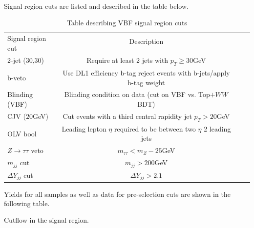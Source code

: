 Signal region cuts are listed and described in the table below.  

\begin{table}[h!]
\centering
\small{
\begin{tabular}{|l|c|c|c|}
\hline
\multirow{2}{*}{Signal region cut}   & Description \\
					&	\\
\hline
2-jet (30,30)           & Require at least 2 jets with $p_T \geq 30$GeV\\
b-veto      		& Use DL1 efficiency b-tag reject events with b-jets/apply b-tag weight \\
Blinding (VBF)          & Blinding condition on data (cut on VBF vs. Top$+WW$ BDT) \\
CJV ($20$GeV)		& Cut events with a third central rapidity jet $p_T > 20$GeV \\
OLV bool	        & Leading lepton $\eta$ required to be between two $\eta$ 2 leading jets \\
$Z\rightarrow\tau\tau$ veto & $m_{\tau\tau} < m_Z - 25$GeV \\ 
$m_{jj}$ cut		& $m_{jj} > 200$GeV \\
$\Delta Y_{jj}$ cut	& $\Delta Y_{jj} > 2.1$ \\
\hline
\end{tabular}
\caption{Table describing VBF signal region cuts}
\label{tab:SRdef}
}
\end{table}

Yields for all samples as well as data for pre-selection cuts are shown in the following table.
\begin{table}[h!]
\scalebox{0.40}{

}
\caption{Cutflow in the signal region.}
\label{tab:srcut}
\end{table}

